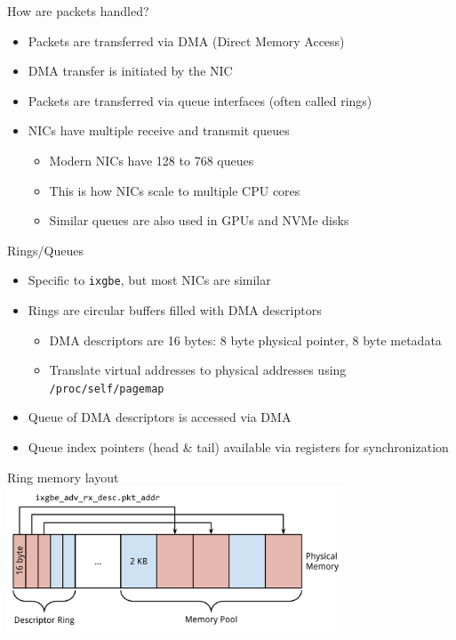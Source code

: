 \documentclass[NET,english,aspectratio=169,notitleframe]{tumbeamer}
\begin{document}
\begin{frame}[fragile=singleslide]{How are packets handled?}
\begin{itemize}
\item Packets are transferred via DMA (Direct Memory Access)
\item DMA transfer is initiated by the NIC
\vspace{1em}
\item Packets are transferred via queue interfaces (often called rings)
\item NICs have multiple receive and transmit queues
\begin{itemize}
\item Modern NICs have 128 to 768 queues
\item This is how NICs scale to multiple CPU cores
\item Similar queues are also used in GPUs and NVMe disks
\end{itemize}
\end{itemize}
\end{frame}

\begin{frame}{Rings/Queues}
\begin{itemize}
\item Specific to \texttt{ixgbe}, but most NICs are similar
\item Rings are circular buffers filled with DMA descriptors
\begin{itemize}
\item DMA descriptors are 16 bytes: 8 byte physical pointer, 8 byte metadata
\item Translate virtual addresses to physical addresses using \texttt{/proc/self/pagemap}
\end{itemize}
\vspace{1em}
\item<2-> Queue of DMA descriptors is accessed via DMA
\item<2-> Queue index pointers (head \& tail) available via registers for synchronization
\end{itemize}
\end{frame}

\begin{frame}{Ring memory layout}
\centering\hspace{1cm}\includegraphics[width=0.75\textwidth]{pics/ring}
\end{frame}
\end{document}
